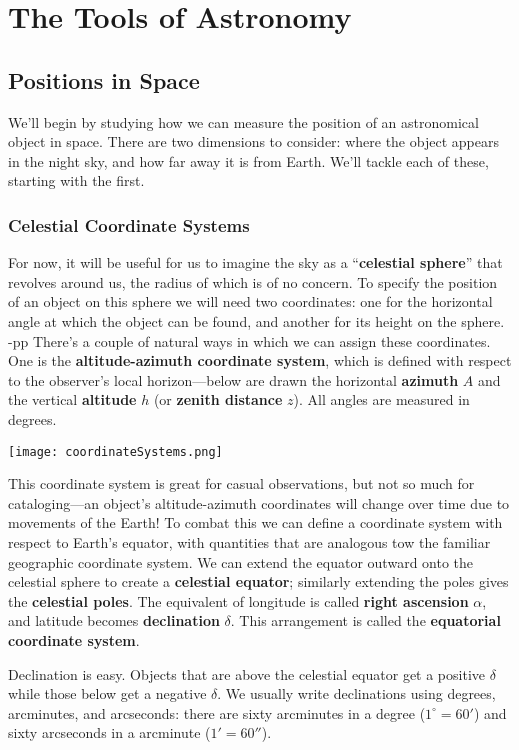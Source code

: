 \documentclass[../a062main.tex]{subfiles}
\begin{document}
\chapter{The Tools of Astronomy}
\section{Positions in Space}
We'll begin by studying how we can measure the position of an astronomical object in space.
There are two dimensions to consider: where the object appears in the night sky, and how far away it is from Earth.
We'll tackle each of these, starting with the first.

\subsection*{Celestial Coordinate Systems}
For now, it will be useful for us to imagine the sky as a ``\textbf{celestial sphere}'' that revolves around us, the radius of which is of no concern.
To specify the position of an object on this sphere we will need two coordinates: one for the horizontal angle at which the object can be found, and another for its height on the sphere.
-pp
There's a couple of natural ways in which we can assign these coordinates.
One is the \textbf{altitude-azimuth coordinate system}, which is defined with respect to the observer's local horizon---below are drawn the horizontal \textbf{azimuth} $A$ and the vertical \textbf{altitude} $h$ (or \textbf{zenith distance} $z$).
All angles are measured in degrees.
\begin{center}
    \texttt{[image: coordinateSystems.png]}
\end{center}
This coordinate system is great for casual observations, but not so much for cataloging---an object's altitude-azimuth coordinates will change over time due to movements of the Earth!
To combat this we can define a coordinate system with respect to Earth's equator, with quantities that are analogous tow the familiar geographic coordinate system.
We can extend the equator outward onto the celestial sphere to create a \textbf{celestial equator}; similarly extending the poles gives the \textbf{celestial poles}.
The equivalent of longitude is called \textbf{right ascension} $\alpha$, and latitude becomes \textbf{declination} $\delta$.
This arrangement is called the \textbf{equatorial coordinate system}.

Declination is easy.
Objects that are above the celestial equator get a positive $\delta$ while those below get a negative $\delta$.
We usually write declinations using degrees, arcminutes, and arcseconds: there are sixty arcminutes in a degree ($1^\circ = 60'$) and sixty arcseconds in a arcminute ($1' = 60''$).
\end{document}

